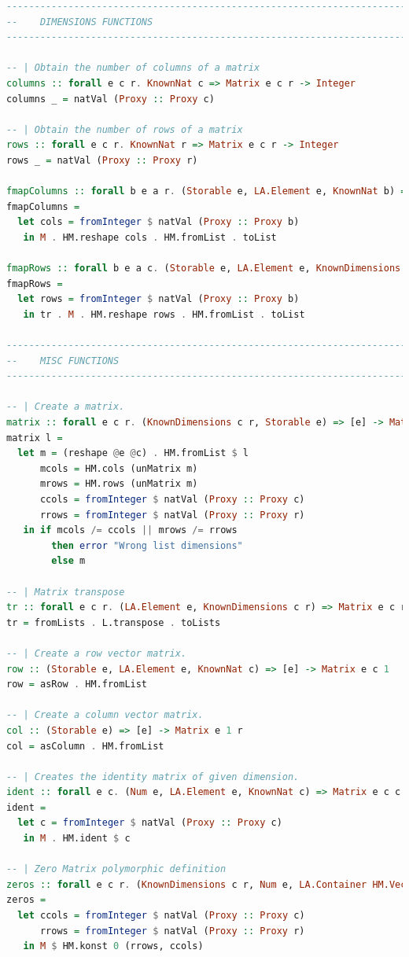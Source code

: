\documentclass[
  oneside,
  11pt, a4paper,
  footinclude=true,
  headinclude=true,
  cleardoublepage=empty
]{scrbook}
\theoremstyle{definition}
\theoremstyle{definition}
\begin{document}
\begin{lstlisting}[language=Haskell, caption={Type safe matrix wrapper library},captionpos=b]
-------------------------------------------------------------------------------
--    DIMENSIONS FUNCTIONS
-------------------------------------------------------------------------------

-- | Obtain the number of columns of a matrix
columns :: forall e c r. KnownNat c => Matrix e c r -> Integer
columns _ = natVal (Proxy :: Proxy c)

-- | Obtain the number of rows of a matrix
rows :: forall e c r. KnownNat r => Matrix e c r -> Integer
rows _ = natVal (Proxy :: Proxy r)

fmapColumns :: forall b e a r. (Storable e, LA.Element e, KnownNat b) => Matrix e a r -> Matrix e b r
fmapColumns =
  let cols = fromInteger $ natVal (Proxy :: Proxy b)
   in M . HM.reshape cols . HM.fromList . toList

fmapRows :: forall b e a c. (Storable e, LA.Element e, KnownDimensions c b) => Matrix e c a -> Matrix e c b
fmapRows =
  let rows = fromInteger $ natVal (Proxy :: Proxy b)
   in tr . M . HM.reshape rows . HM.fromList . toList

-------------------------------------------------------------------------------
--    MISC FUNCTIONS
-------------------------------------------------------------------------------

-- | Create a matrix.
matrix :: forall e c r. (KnownDimensions c r, Storable e) => [e] -> Matrix e c r
matrix l =
  let m = (reshape @e @c) . HM.fromList $ l
      mcols = HM.cols (unMatrix m)
      mrows = HM.rows (unMatrix m)
      ccols = fromInteger $ natVal (Proxy :: Proxy c)
      rrows = fromInteger $ natVal (Proxy :: Proxy r)
   in if mcols /= ccols || mrows /= rrows
        then error "Wrong list dimensions"
        else m

-- | Matrix transpose
tr :: forall e c r. (LA.Element e, KnownDimensions c r) => Matrix e c r -> Matrix e r c
tr = fromLists . L.transpose . toLists

-- | Create a row vector matrix.
row :: (Storable e, LA.Element e, KnownNat c) => [e] -> Matrix e c 1
row = asRow . HM.fromList

-- | Create a column vector matrix.
col :: (Storable e) => [e] -> Matrix e 1 r
col = asColumn . HM.fromList

-- | Creates the identity matrix of given dimension.
ident :: forall e c. (Num e, LA.Element e, KnownNat c) => Matrix e c c
ident =
  let c = fromInteger $ natVal (Proxy :: Proxy c)
   in M . HM.ident $ c

-- | Zero Matrix polymorphic definition
zeros :: forall e c r. (KnownDimensions c r, Num e, LA.Container HM.Vector e) => Matrix e c r
zeros =
  let ccols = fromInteger $ natVal (Proxy :: Proxy c)
      rrows = fromInteger $ natVal (Proxy :: Proxy r)
   in M $ HM.konst 0 (rrows, ccols)


\end{lstlisting}
\end{document}
